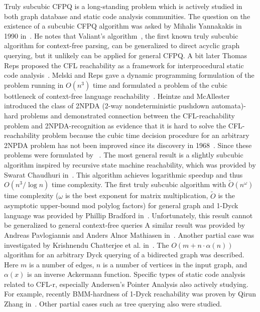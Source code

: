 Truly subcubic CFPQ is a long-standing problem which is actively studied in both graph database and static code analysis communities.
The question on the existence of a subcubic CFPQ algorithm was asked by Mihalis Yannakakis in 1990 in~\cite{Yannakakis}.
He notes that Valiant's algorithm~\cite{10.1016/S0022-0000(75)80046-8}, the first known truly subcubic algorithm for context-free parsing, can be generalized to direct acyclic graph querying, but it unlikely can be applied for general CFPQ. 
A bit later Thomas Reps proposed the CFL reachability as a framework for interprocedural static code analysis~\cite{10.5555/271338.271343}. Melski and Reps gave a dynamic programming formulation of the problem running in $O(n^3)$ time and formulated a problem of the cubic bottleneck of context-free language reachability~\cite{10.1145/258993.259006}.
Heintze and McAllester introduced the class of 2NPDA (2-way nondeterministic pushdown automata)-hard problems and demonstrated connection between the CFL-reachability problem and 2NPDA-recognition as evidence that it is hard to solve the CFL-reachability problem because the cubic time decision procedure for an arbitrary 2NPDA problem has not been improved since its discovery in 1968~\cite{10.5555/788019.788876}.
Since these problems were formulated by ~\cite{}.
The most general result is a slightly subcubic algorithm inspired by recursive state machine reachability, which was provided by Swarat Chaudhuri in~\cite{10.1145/1328897.1328460}.
This algorithm achieves logarithmic speedup and thus $O(n^3/\log{n})$ time complexity. 
The first truly subcubic algorithm with $\widetilde{O}(n^\omega)$ time complexity ($\omega$ is the best exponent for matrix multiplication, $\widetilde{O}$ is the asymptotic upper-bound mod polylog factors) for general graph and 1-Dyck language was provided by Phillip Bradford in~\cite{Bradford2017EfficientEP}. Unfortunately, this result cannot be generalized to general context-free queries
A similar result was provided by Andreas Pavlogiannis and Anders Alnor Mathiasen in~\cite{pavlogiannis2020finegrained}.
Another partial case was investigated by Krishnendu Chatterjee et al. in~\cite{10.1145/3158118}.
The $O(m + n \cdot \alpha(n))$ algorithm for an arbitrary Dyck querying of a bidirected graph was described. Here $m$ is a number of edges, $n$ is a number of vertices in the input graph, and $\alpha(x)$ is an inverse Ackermann function.
Specific types of static code analysis related to CFL-r, especially Andersen's Pointer Analysis also actively studying.
For example, recently BMM-hardness of 1-Dyck reachability was proven by	Qirun Zhang in~\cite{zhang2020conditional}.
Other partial cases such as tree querying also were studied.

